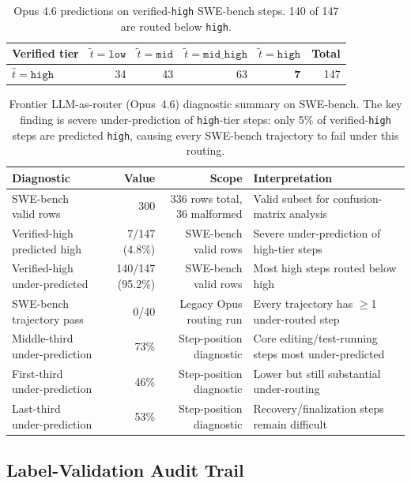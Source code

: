 \begin{table}[ht]
\centering
\small
\begin{tabular}{lrrrrr}
\toprule
Verified tier & $\tilde{t}=\texttt{low}$ & $\tilde{t}=\texttt{mid}$ & $\tilde{t}=\texttt{mid\_high}$ & $\tilde{t}=\texttt{high}$ & Total \\
\midrule
$\hat{t}=\texttt{high}$ & 34 & 43 & 63 & \textbf{7} & 147 \\
\bottomrule
\end{tabular}
\caption{Opus 4.6 predictions on verified-\texttt{high} SWE-bench steps.
140 of 147 are routed below \texttt{high}.}
\label{tab:opus-high}
\end{table}

\begin{table}[ht]
\centering
\small
\caption{Frontier LLM-as-router (Opus~4.6) diagnostic summary on SWE-bench.
The key finding is severe under-prediction of \texttt{high}-tier steps:
only 5\% of verified-\texttt{high} steps are predicted \texttt{high},
causing every SWE-bench trajectory to fail under this routing.}
\label{tab:appendix-opus-bias}
\begin{tabularx}{\linewidth}{lrr X}
\toprule
Diagnostic & Value & Scope & Interpretation \\
\midrule
SWE-bench valid rows & 300 & 336 rows total, 36 malformed & Valid subset for confusion-matrix analysis \\
Verified-high predicted high & 7/147 (4.8\%) & SWE-bench valid rows & Severe under-prediction of high-tier steps \\
Verified-high under-predicted & 140/147 (95.2\%) & SWE-bench valid rows & Most high steps routed below high \\
SWE-bench trajectory pass & 0/40 & Legacy Opus routing run & Every trajectory has $\ge$1 under-routed step \\
Middle-third under-prediction & 73\% & Step-position diagnostic & Core editing/test-running steps most under-predicted \\
First-third under-prediction & 46\% & Step-position diagnostic & Lower but still substantial under-routing \\
Last-third under-prediction & 53\% & Step-position diagnostic & Recovery/finalization steps remain difficult \\
\bottomrule
\end{tabularx}
\end{table}

\subsection{Label-Validation Audit Trail}
\label{app:validation}

